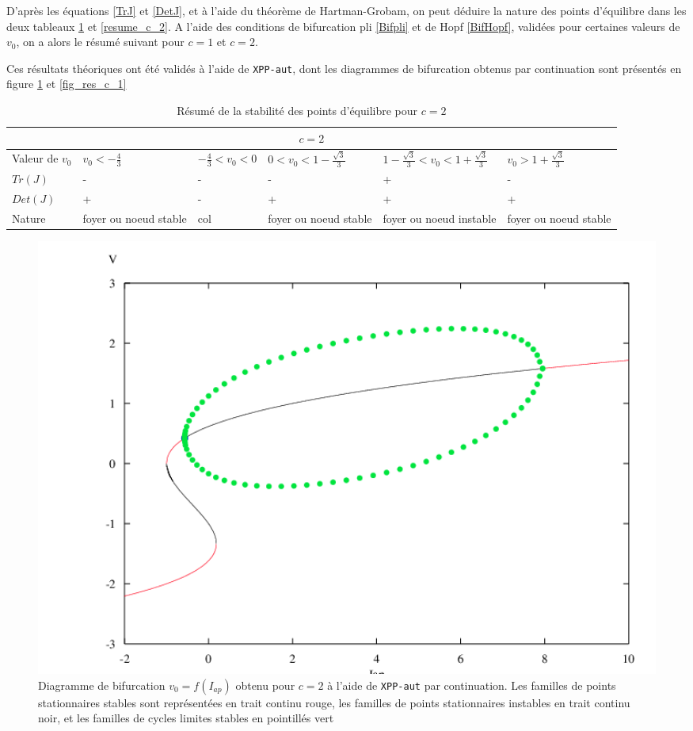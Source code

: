 \documentclass[12pt,a4paper,onecolumn]{article}
\begin{document}
D'après les équations \ref{TrJ} et \ref{DetJ}, et à l'aide du théorème de Hartman-Grobam, on peut déduire la nature des points d'équilibre dans les deux tableaux \ref{resume_c_1} et \ref{resume_c_2}.
A l'aide des conditions de bifurcation pli \ref{Bifpli} et de Hopf \ref{BifHopf}, validées pour certaines valeurs de $v_0$, on a alors le résumé suivant pour $c=1$ et $c=2$.

Ces résultats théoriques ont été validés à l'aide de \texttt{XPP-aut}, dont les diagrammes de bifurcation obtenus par continuation sont présentés en figure \ref{fig_res_c_2} et \ref{fig_res_c_1}

\newpage

\begin{table}[H]
\begin{tabular}{|L{2cm} | C{2cm} | C{2.5cm} | C{2.5cm} |C{2.5cm}|C{2.5cm}|}
\hline
{}
\\\hline
Valeur de $v_0$ & $v_0 < - \frac{4}{3}$ & $- \frac{4}{3} < v_0 < 0$ & $0 < v_0 < 1 - \frac{\sqrt{3}}{3}$ & $1 - \frac{\sqrt{3}}{3} < v_0 < 1 + \frac{\sqrt{3}}{3}$ &$v_0 > 1 + \frac{\sqrt{3}}{3}$ \\
 \hline
$Tr(J)$ & - & - & - & + & - \\ \hline
$Det(J)$ & + & - & + & + &+ \\ \hline
Nature & foyer ou noeud stable  & col & foyer ou noeud stable & foyer ou noeud instable & foyer ou noeud stable \\ \hline
\end{tabular}
\caption{Résumé de la stabilité des points d'équilibre pour $c = 2$}
\label{resume_c_1}
\end{table}

\begin{figure}[H]
\begin{center}
\includegraphics[width = 1.0\textwidth]{bif_20.png}
\end{center}
\caption{Diagramme de bifurcation $v_0=f(I_{ap})$ obtenu pour $c=2$ à l'aide de \texttt{XPP-aut} par continuation. Les familles de points stationnaires stables sont représentées en trait continu rouge, les familles de points stationnaires instables en trait continu noir, et les familles de cycles limites stables en pointillés vert}
\label{fig_res_c_2}
\end{figure}
\end{document}
